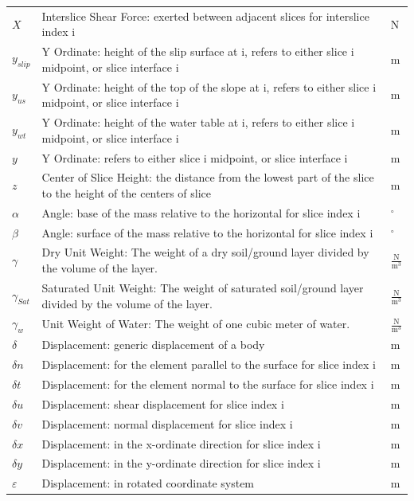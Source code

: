 \documentclass[12pt]{article}
\begin{document}
\begin{longtabu}{l X[l] l}
\\
$X$ & Interslice Shear Force: exerted between adjacent slices for interslice index i & N
\\
${y_{slip}}$ & Y Ordinate: height of the slip surface at i, refers to either slice i midpoint, or slice interface i & m
\\
${y_{us}}$ & Y Ordinate: height of the top of the slope at i, refers to either slice i midpoint, or slice interface i & m
\\
${y_{wt}}$ & Y Ordinate: height of the water table at i, refers to either slice i midpoint, or slice interface i & m
\\
$y$ & Y Ordinate: refers to either slice i midpoint, or slice interface i & m
\\
$z$ & Center of Slice Height: the distance from the lowest part of the slice to the height of the centers of slice & m
\\
$α$ & Angle: base of the mass relative to the horizontal for slice index i & ${}^{\circ}$
\\
$β$ & Angle: surface of the mass relative to the horizontal for slice index i & ${}^{\circ}$
\\
$γ$ & Dry Unit Weight: The weight of a dry soil/ground layer divided by the volume of the layer. & $\frac{\text{N}}{\text{m}^{3}}$
\\
${γ_{Sat}}$ & Saturated Unit Weight: The weight of saturated soil/ground layer divided by the volume of the layer. & $\frac{\text{N}}{\text{m}^{3}}$
\\
${γ_{w}}$ & Unit Weight of Water: The weight of one cubic meter of water. & $\frac{\text{N}}{\text{m}^{3}}$
\\
$δ$ & Displacement: generic displacement of a body & m
\\
$δn$ & Displacement: for the element parallel to the surface for slice index i & m
\\
$δt$ & Displacement: for the element normal to the surface for slice index i & m
\\
$δu$ & Displacement: shear displacement for slice index i & m
\\
$δv$ & Displacement: normal displacement for slice index i & m
\\
$δx$ & Displacement: in the x-ordinate direction for slice index i & m
\\
$δy$ & Displacement: in the y-ordinate direction for slice index i & m
\\
$ε$ & Displacement: in rotated coordinate system & m
\\

\end{longtabu}
\end{document}
